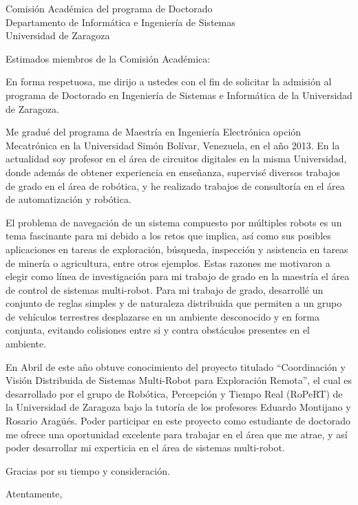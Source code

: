\documentclass[10pt]{letter}
\begin{document}
\begin{letter}{Comisión Académica del programa de Doctorado\\
    Departamento de Informática e Ingeniería de Sistemas\\
    Universidad de Zaragoza}

\opening{Estimados miembros de la Comisión Académica:}

En forma respetuosa, me dirijo a ustedes con el fin de solicitar la admisión al
programa de Doctorado en Ingeniería de Sistemas e Informática de la Universidad
de Zaragoza.

Me gradué del programa de Maestría en Ingeniería Electrónica opción Mecatrónica
en la Universidad Simón Bolívar, Venezuela, en el año 2013. En la actualidad soy
profesor en el área de circuitos digitales en la misma Universidad, donde además
de obtener experiencia en enseñanza, supervisé diversos trabajos de grado en el
área de robótica, y he realizado trabajos de consultoría en el área de
automatización y robótica.

El problema de navegación de un sistema compuesto por múltiples robots es un
tema fascinante para mi debido a los retos que implica, así como sus posibles
aplicaciones en tareas de exploración, búsqueda, inspección y asistencia en
tareas de minería o agricultura, entre otros ejemplos.
Estas razones me motivaron a elegir como línea de investigación para mi trabajo
de grado en la maestría el área de control de sistemas multi-robot. Para mi
trabajo de grado, desarrollé un conjunto de reglas simples y de
naturaleza distribuida que permiten a un grupo de vehículos terrestres
desplazarse en un ambiente desconocido y en forma conjunta, evitando colisiones
entre si y contra obstáculos presentes en el ambiente.

En Abril de este año obtuve conocimiento del proyecto titulado ``Coordinación y
Visión  Distribuida de Sistemas Multi-Robot para Exploración Remota'', el cual es
desarrollado por el grupo de Robótica, Percepción y Tiempo Real (RoPeRT) de la
Universidad  de Zaragoza bajo la tutoría de los profesores Eduardo Montijano y
Rosario Aragüés. Poder participar en este proyecto como estudiante de doctorado
me ofrece una oportunidad excelente para trabajar en el área que me atrae, y así
poder desarrollar mi experticia en el área de sistemas multi-robot.

Gracias por su tiempo y consideración.

\closing{Atentamente,}


\end{letter}
\end{document}

